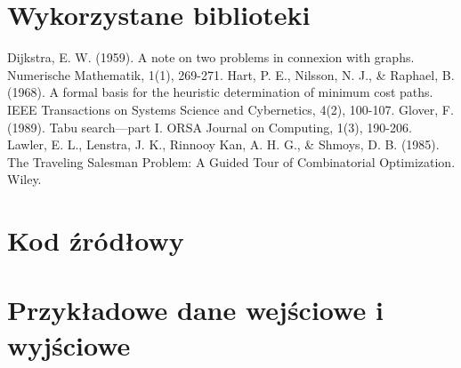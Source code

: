\documentclass[12pt,a4paper]{article}
\begin{document}
\section{Wykorzystane biblioteki}

\begin{thebibliography}{9}
     Dijkstra, E. W. (1959). A note on two problems in connexion with graphs. Numerische Mathematik, 1(1), 269-271.
     Hart, P. E., Nilsson, N. J., & Raphael, B. (1968). A formal basis for the heuristic determination of minimum cost paths. IEEE Transactions on Systems Science and Cybernetics, 4(2), 100-107.
     Glover, F. (1989). Tabu search—part I. ORSA Journal on Computing, 1(3), 190-206.
     Lawler, E. L., Lenstra, J. K., Rinnooy Kan, A. H. G., & Shmoys, D. B. (1985). The Traveling Salesman Problem: A Guided Tour of Combinatorial Optimization. Wiley.
\end{thebibliography}

\appendix
\section{Kod źródłowy}

\section{Przykładowe dane wejściowe i wyjściowe}
\end{document}
